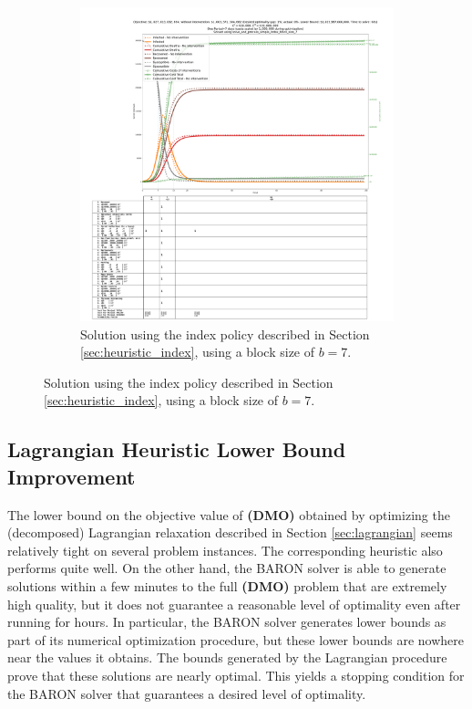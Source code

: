 \documentclass{article}
\newcommand{\model}{{\bf (DMO) }}
\begin{document}
\begin{figure}[H]\ContinuedFloat
    \begin{subfigure}{\textwidth}
        \begin{center}
            \includegraphics[width=1.2\linewidth]{figures/heuristic_solutions/system_state_vs_time_T100_baron__solve_and_process_simple_index_block_size_7.pdf}
        \end{center}
        \caption{Solution using the index policy described in Section \ref{sec:heuristic_index}, using a block size of $b=7$.}\label{fig:heuristic_index_blocksize7}
    \end{subfigure}
\end{figure}


\subsection{Lagrangian Heuristic Lower Bound Improvement}

The lower bound on the objective value of \model obtained by optimizing the (decomposed) Lagrangian relaxation described in Section \ref{sec:lagrangian} seems relatively tight on several problem instances. The corresponding heuristic also performs quite well. On the other hand, the BARON solver is able to generate solutions within a few minutes to the full \model problem that are extremely high quality, but it does not guarantee a reasonable level of optimality even after running for hours. In particular, the BARON solver generates lower bounds as part of its numerical optimization procedure, but these lower bounds are nowhere near the values it obtains. The bounds generated by the Lagrangian procedure prove that these solutions are nearly optimal. This yields a stopping condition for the BARON solver that guarantees a desired level of optimality.
\end{document}

